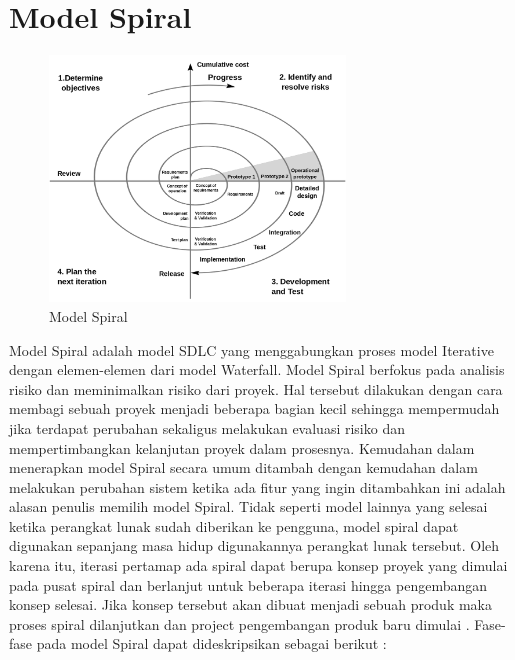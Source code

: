 \section{Model Spiral} 

\begin{figure}[H]
	\centering
	\includegraphics[width=0.7\textwidth]{gambar/Spiral}
	\caption{Model Spiral}
\end{figure}
Model Spiral adalah model SDLC yang menggabungkan proses model Iterative dengan elemen-elemen dari model Waterfall. Model Spiral berfokus pada analisis risiko dan meminimalkan risiko dari proyek. Hal tersebut dilakukan dengan cara membagi sebuah proyek menjadi beberapa bagian kecil sehingga mempermudah jika terdapat perubahan sekaligus melakukan evaluasi risiko dan mempertimbangkan kelanjutan proyek dalam prosesnya. Kemudahan dalam menerapkan model Spiral secara umum ditambah dengan kemudahan dalam melakukan perubahan sistem ketika ada fitur yang ingin ditambahkan ini adalah alasan penulis memilih model Spiral. Tidak seperti model lainnya yang selesai ketika perangkat lunak sudah diberikan ke pengguna, model spiral dapat digunakan sepanjang masa hidup digunakannya perangkat lunak tersebut. Oleh karena itu, iterasi pertamap ada spiral dapat berupa konsep proyek yang dimulai pada pusat spiral dan berlanjut untuk beberapa iterasi hingga pengembangan konsep selesai. Jika konsep tersebut akan dibuat menjadi sebuah produk maka proses spiral dilanjutkan dan project pengembangan produk baru dimulai \citep{Pressman2010}. Fase-fase pada model Spiral dapat dideskripsikan sebagai berikut \citep{Alshamrani2015}: 

